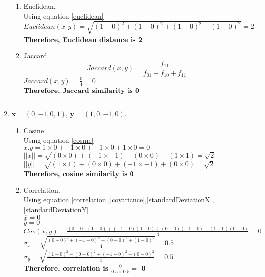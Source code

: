 \documentclass{article}
\begin{document}
\begin{enumerate}
\begin{enumerate}
        \item Euclidean.\\
        Using equation \ref{euclidean}\\
        $Euclidean(x,y) = \sqrt{(1-0)^2+(1-0)^2+(1-0)^2+(1-0)^2} = 2$\\
        \textbf{Therefore, Euclidean distance is 2}\\
        \item Jaccard.\\
        \begin{equation} \label{jaccard}
            Jaccard(x,y) =  \frac{f_{11}}{f_{01}+f_{10}+f_{11}}
        \end{equation}
        $Jaccard(x,y) = \frac{0}{4} = 0$\\
        \textbf{Therefore, Jaccard similarity is 0}\\
        \end{enumerate}
        $$$$
    \item $\textbf{x} = (0,-1,0,1)$, $\textbf{y} = (1,0,-1,0)$.\\  
        \begin{enumerate}
        \item Cosine\\
        Using equation \ref{cosine}\\
        $x.y = 1\times0 + -1\times0 + -1\times0 +  1\times0 = 0$\\
        $||x|| = \sqrt{(0\times0)+(-1\times-1)+(0\times0)+(1\times1)} = \sqrt{2}$\\
        $||y|| = \sqrt{(1\times1)+(0\times0)+(-1\times-1)+(0\times0)} = \sqrt{2}$\\
        \textbf{Therefore, cosine similarity is 0}
        \item Correlation.\\
        Using equation \ref{correlation},\ref{covariance},\ref{standardDeviationX},\ref{standardDeviationY}\\
        $\overline{x} = 0$ \\
        $\overline{y} = 0$\\
        $Cov(x,y) = \frac{(0-0)(1-0)+(-1-0)(0-0)+(0-0)(-1-0)+(1-0)(0-0)}{4} = 0$\\
        $\sigma_x = \sqrt{\frac{(0-0)^2+(-1-0)^2+(0-0)^2+(1-0)^2}{4}} = 0.5$\\
        $\sigma_y = \sqrt{\frac{(1-0)^2+(0-0)^2+(-1-0)^2+(0-0)^2}{4}} = 0.5$\\
        \textbf{Therefore, correlation is $\frac{0}{0.5\times0.5} =$ 0}\\

\end{enumerate}
\end{enumerate}
\end{document}
